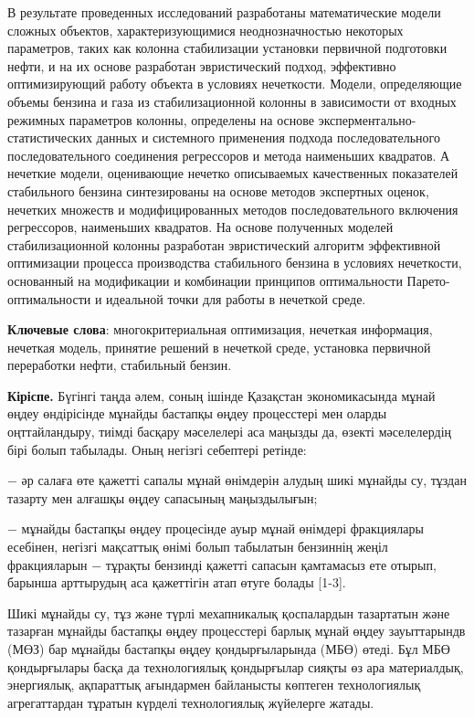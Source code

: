 В результате проведенных исследований разработаны математические модели
сложных объектов, характеризующимися неоднозначностью некоторых
параметров, таких как колонна стабилизации установки первичной
подготовки нефти, и на их основе разработан эвристический подход,
эффективно оптимизирующий работу объекта в условиях нечеткости. Модели,
определяющие объемы бензина и газа из стабилизационной колонны в
зависимости от входных режимных параметров колонны, определены на основе
эксперментально-статистических данных и системного применения подхода
последовательного последовательного соединения регрессоров и метода
наименьших квадратов. А нечеткие модели, оценивающие нечетко описываемых
качественных показателей стабильного бензина синтезированы на основе
методов экспертных оценок, нечетких множеств и модифицированных методов
последовательного включения регрессоров, наименьших квадратов. На основе
полученных моделей стабилизационной колонны разработан эвристический
алгоритм эффективной оптимизации процесса производства стабильного
бензина в условиях нечеткости, основанный на модификации и комбинации
принципов оптимальности Парето-оптимальности и идеальной точки для
работы в нечеткой среде.

{\bfseries Ключевые слова}: многокритериальная оптимизация, нечеткая
информация, нечеткая модель, принятие решений в нечеткой среде,
установка первичной переработки нефти, стабильный бензин.

{\bfseries Кіріспе.} Бүгінгі таңда әлем, соның ішінде Қазақстан
экономикасында мұнай өңдеу өндірісінде мұнайды бастапқы өңдеу
процесстері мен оларды оңттайландыру, тиімді басқару мәселелері аса
маңызды да, өзекті мәселелердің бірі болып табылады. Оның негізгі
себептері ретінде:

− әр салаға өте қажетті сапалы мұнай өнімдерін алудың шикі мұнайды су,
тұздан тазарту мен алғашқы өңдеу сапасының маңыздылығын;

− мұнайды бастапқы өңдеу процесінде ауыр мұнай өнімдері фракциялары
есебінен, негізгі мақсаттық өнімі болып табылатын бензиннің жеңіл
фракцияларын − тұрақты бензинді қажетті сапасын қамтамасыз ете отырып,
барынша арттырудың аса қажеттігін атап өтуге болады {[}1-3{]}.

Шикі мұнайды су, тұз және түрлі мехапникалық қоспалардын тазартатын және
тазарған мұнайды бастапқы өңдеу процесстері барлық мұнай өңдеу
зауыттарындв (МӨЗ) бар мұнайды бастапқы өңдеу қондырғыларында (МБӨ)
өтеді. Бұл МБӨ қондырғылары басқа да технологиялық қондырғылар сияқты өз
ара материалдық, энергиялық, ақпараттық ағындармен байланысты көптеген
технологиялық агрегаттардан тұратын күрделі технологиялық жүйелерге
жатады.

